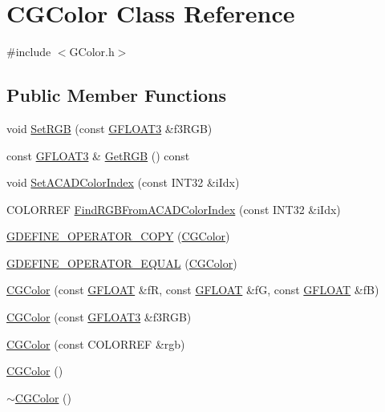 \hypertarget{class_c_g_color}{}\section{C\+G\+Color Class Reference}
\label{class_c_g_color}


{\ttfamily \#include $<$G\+Color.\+h$>$}

\subsection*{Public Member Functions}
\begin{DoxyCompactItemize}
\item 
void \hyperlink{class_c_g_color_ab191de48b83a12e6cc6efec329ff1098}{Set\+R\+G\+B} (const \hyperlink{_g_types_8h_a7f35886af6bc3271b59984611c1028fb}{G\+F\+L\+O\+A\+T3} \&f3\+R\+G\+B)
\item 
const \hyperlink{_g_types_8h_a7f35886af6bc3271b59984611c1028fb}{G\+F\+L\+O\+A\+T3} \& \hyperlink{class_c_g_color_aff88f1ea09df6ddf343ab21c8c13644c}{Get\+R\+G\+B} () const 
\item 
void \hyperlink{class_c_g_color_ad9be0194b075791a4aec0545871ebd3f}{Set\+A\+C\+A\+D\+Color\+Index} (const I\+N\+T32 \&i\+Idx)
\item 
C\+O\+L\+O\+R\+R\+E\+F \hyperlink{class_c_g_color_a8a3807373754c569db52e6c7179b5325}{Find\+R\+G\+B\+From\+A\+C\+A\+D\+Color\+Index} (const I\+N\+T32 \&i\+Idx)
\item 
\hyperlink{class_c_g_color_aa64cc9438e2710d0afc6c7b3b04c3a23}{G\+D\+E\+F\+I\+N\+E\+\_\+\+O\+P\+E\+R\+A\+T\+O\+R\+\_\+\+C\+O\+P\+Y} (\hyperlink{class_c_g_color}{C\+G\+Color})
\item 
\hyperlink{class_c_g_color_a5cfe13707a22d5f5e2cbd58e2b62126b}{G\+D\+E\+F\+I\+N\+E\+\_\+\+O\+P\+E\+R\+A\+T\+O\+R\+\_\+\+E\+Q\+U\+A\+L} (\hyperlink{class_c_g_color}{C\+G\+Color})
\item 
\hyperlink{class_c_g_color_a1d796defef958d85d01d51ddb2228a51}{C\+G\+Color} (const \hyperlink{_g_types_8h_abf6eba8223df62f199b811a6c52ff2ef}{G\+F\+L\+O\+A\+T} \&f\+R, const \hyperlink{_g_types_8h_abf6eba8223df62f199b811a6c52ff2ef}{G\+F\+L\+O\+A\+T} \&f\+G, const \hyperlink{_g_types_8h_abf6eba8223df62f199b811a6c52ff2ef}{G\+F\+L\+O\+A\+T} \&f\+B)
\item 
\hyperlink{class_c_g_color_a6913a0b3050f8ddfbe74864666d1b265}{C\+G\+Color} (const \hyperlink{_g_types_8h_a7f35886af6bc3271b59984611c1028fb}{G\+F\+L\+O\+A\+T3} \&f3\+R\+G\+B)
\item 
\hyperlink{class_c_g_color_a63fe7a9f654dcd5cc9a618872f1bcb4a}{C\+G\+Color} (const C\+O\+L\+O\+R\+R\+E\+F \&rgb)
\item 
\hyperlink{class_c_g_color_af1960d7abb717f4504305cd6e3e659ed}{C\+G\+Color} ()
\item 
\hyperlink{class_c_g_color_a5b59f5126785b914c2754999b17adffe}{$\sim$\+C\+G\+Color} ()
\end{DoxyCompactItemize}


